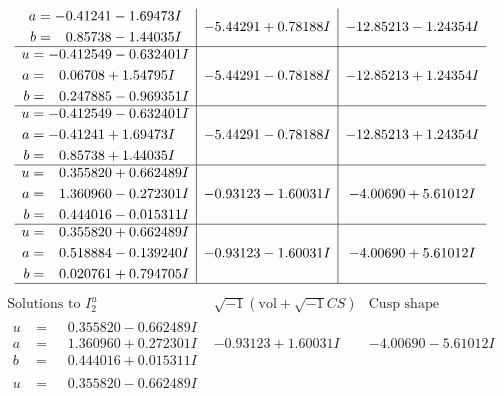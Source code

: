 \documentclass[1p]{elsarticle_modified}
\theoremstyle{definition}
\newcommand{\I}{\sqrt{-1}}
\begin{document}
$$\begin{array}{c|c|c}
\begin{aligned}
a &= -0.41241 - 1.69473 I \\
b &= \phantom{-}0.85738 - 1.44035 I\end{aligned}
 & -5.44291 + 0.78188 I & -12.85213 - 1.24354 I \\ \hline\begin{aligned}
u &= -0.412549 - 0.632401 I \\
a &= \phantom{-}0.06708 + 1.54795 I \\
b &= \phantom{-}0.247885 - 0.969351 I\end{aligned}
 & -5.44291 - 0.78188 I & -12.85213 + 1.24354 I \\ \hline\begin{aligned}
u &= -0.412549 - 0.632401 I \\
a &= -0.41241 + 1.69473 I \\
b &= \phantom{-}0.85738 + 1.44035 I\end{aligned}
 & -5.44291 - 0.78188 I & -12.85213 + 1.24354 I \\ \hline\begin{aligned}
u &= \phantom{-}0.355820 + 0.662489 I \\
a &= \phantom{-}1.360960 - 0.272301 I \\
b &= \phantom{-}0.444016 - 0.015311 I\end{aligned}
 & -0.93123 - 1.60031 I & -4.00690 + 5.61012 I \\ \hline\begin{aligned}
u &= \phantom{-}0.355820 + 0.662489 I \\
a &= \phantom{-}0.518884 - 0.139240 I \\
b &= \phantom{-}0.020761 + 0.794705 I\end{aligned}
 & -0.93123 - 1.60031 I & -4.00690 + 5.61012 I\\
 \hline 
 \end{array}$$\newpage$$\begin{array}{c|c|c}  
\text{Solutions to }I^u_{2}& \I (\text{vol} + \sqrt{-1}CS) & \text{Cusp shape}\\
 \hline 
\begin{aligned}
u &= \phantom{-}0.355820 - 0.662489 I \\
a &= \phantom{-}1.360960 + 0.272301 I \\
b &= \phantom{-}0.444016 + 0.015311 I\end{aligned}
 & -0.93123 + 1.60031 I & -4.00690 - 5.61012 I \\ \hline\begin{aligned}
u &= \phantom{-}0.355820 - 0.662489 I \\

\end{aligned}
\end{array}$$
\end{document}
